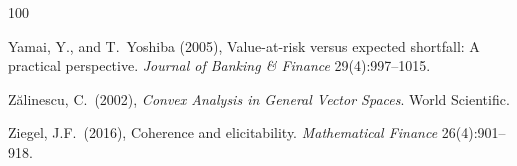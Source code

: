 \documentclass[12pt]{article}
\theoremstyle{plain}
\theoremstyle{definition}
\theoremstyle{remark}
\numberwithin{equation}{section}
\begin{document}
\begin{thebibliography}{100}
{ Yamai, Y., and T.\ Yoshiba (2005), Value-at-risk versus expected shortfall: A practical perspective. {\em Journal of Banking \& Finance} 29(4):997--1015.

 Z\u{a}linescu, C.\ (2002), \textit{Convex Analysis in General Vector Spaces}. World Scientific.

 Ziegel, J.F.\ (2016), Coherence and elicitability. {\em Mathematical Finance} 26(4):901--918.

}

\end{thebibliography}
\end{document}
